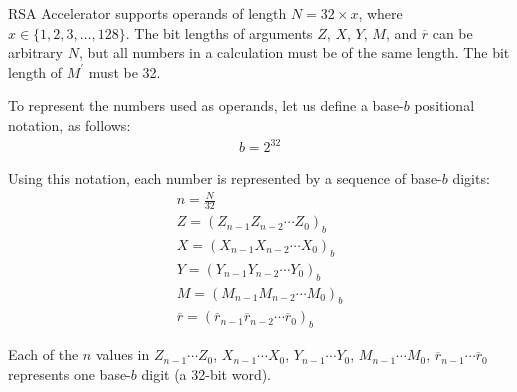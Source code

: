 \documentclass[main\_\_EN.tex]{subfiles}
\begin{document}
RSA Accelerator supports operands of length \begin{math}N = 32 \times x\end{math}, where \begin{math}x \in \{ 1,2,3, \dots, 128\} \end{math}. The bit lengths of arguments \begin{math}Z\end{math}, \begin{math}X\end{math}, \begin{math}Y\end{math}, \begin{math}M\end{math}, and \begin{math}\overline{r}\end{math}
can be arbitrary \begin{math}N\end{math}, but all numbers in a calculation must be of the same length. The bit length of \begin{math}M^{\prime}\end{math} must be 32.

To represent the numbers used as operands, let us define a base-\begin{math}b\end{math} positional notation, as follows:
\begin{gather*}
    b = 2^{32}
\end{gather*}

Using this notation, each number is represented by a sequence of base-\begin{math}b\end{math} digits:
\begin{gather*}
    n = \frac{N}{32} \\
    Z = ( Z_{n-1} Z_{n-2} \cdots Z_{0} )_{b} \\
    X = ( X_{n-1} X_{n-2} \cdots X_{0} )_{b} \\
    Y = ( Y_{n-1} Y_{n-2} \cdots Y_{0} )_{b} \\
    M = ( M_{n-1} M_{n-2} \cdots M_{0} )_{b} \\
    \overline{r} = ( \overline{r}_{n-1} \overline{r}_{n-2} \cdots \overline{r}_{0} )_{b}
\end{gather*}

Each of the \begin{math}n\end{math} values in
\begin{math}Z_{n-1} \cdots Z_{0}\end{math},
\begin{math}X_{n-1} \cdots X_{0}\end{math},
\begin{math}Y_{n-1} \cdots Y_{0}\end{math},
\begin{math}M_{n-1} \cdots M_{0}\end{math},
\begin{math}\overline{r}_{n-1}\cdots \overline{r}_{0}\end{math} represents one base-\begin{math}b\end{math} digit (a 32-bit word).
\end{document}
